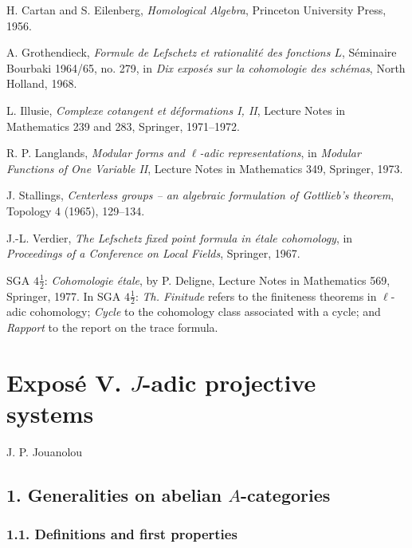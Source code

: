 \documentclass[11pt]{article}
\theoremstyle{plain}
\theoremstyle{definition}
\theoremstyle{remark}
\begin{document}
\begin{enumerate}[label={[\arabic*]}]
\item H. Cartan and S. Eilenberg, \emph{Homological Algebra}, Princeton University Press, 1956.
\item A. Grothendieck, \emph{Formule de Lefschetz et rationalité des fonctions $L$}, Séminaire Bourbaki 1964/65, no. 279, in \emph{Dix exposés sur la cohomologie des schémas}, North Holland, 1968.
\item L. Illusie, \emph{Complexe cotangent et déformations I, II}, Lecture Notes in Mathematics 239 and 283, Springer, 1971--1972.
\item R. P. Langlands, \emph{Modular forms and $\ell$-adic representations}, in \emph{Modular Functions of One Variable II}, Lecture Notes in Mathematics 349, Springer, 1973.
\item J. Stallings, \emph{Centerless groups -- an algebraic formulation of Gottlieb's theorem}, Topology 4 (1965), 129--134.
\item J.-L. Verdier, \emph{The Lefschetz fixed point formula in étale cohomology}, in \emph{Proceedings of a Conference on Local Fields}, Springer, 1967.
\end{enumerate}

SGA $4\frac12$: \emph{Cohomologie étale}, by P. Deligne, Lecture Notes in Mathematics
569, Springer, 1977. In SGA $4\frac12$: \emph{Th. Finitude} refers to the finiteness
theorems in $\ell$-adic cohomology; \emph{Cycle} to the cohomology class associated
with a cycle; and \emph{Rapport} to the report on the trace formula.

\newpage

\section*{Exposé V. $J$-adic projective systems}
\begin{center}
\large J. P. Jouanolou
\end{center}

\subsection*{1. Generalities on abelian $A$-categories}

\subsubsection*{1.1. Definitions and first properties}
\end{document}
